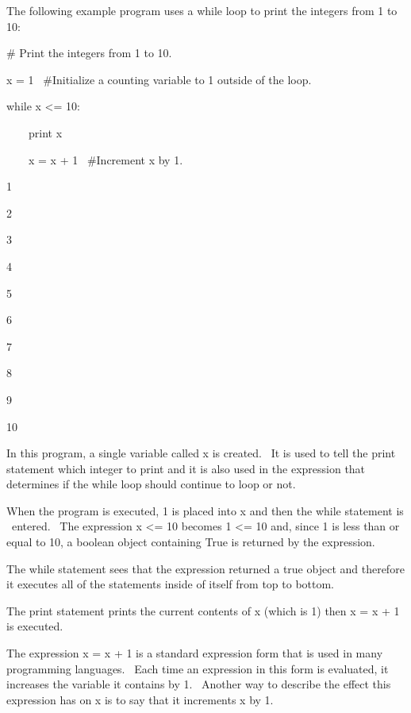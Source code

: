 \documentclass[12pt,twoside]{book}
\begin{document}
\bigskip

The following example program uses a while loop to print the integers from 1 to 10:


\bigskip

\# Print the integers from 1 to 10.


\bigskip

x = 1 \ \#Initialize a counting variable to 1 outside of the loop.


\bigskip

while x {\textless}= 10:

\ \ \ \ print x

\ \ \ \ x = x + 1 \ \#Increment x by 1.

{\textbar}

1

2

3

4

5

6

7

8

9

10

In this program, a single variable called x is created. \ It is used to tell the print statement which integer to print and it is also used in the expression that determines if the while loop should continue to loop or not. 

\bigskip

When the program is executed, 1 is placed into x and then the while statement is \ entered. \ The expression x {\textless}= 10 becomes 1 {\textless}= 10 and, since 1 is less than or equal to 10, a boolean object containing True is returned by the expression. 

\bigskip

The while statement sees that the expression returned a true object and therefore it executes all of the statements inside of itself from top to bottom.

\bigskip

The print statement prints the current contents of x (which is 1) then x = x + 1 is executed.

\bigskip

The expression x = x + 1 is a standard expression form that is used in many programming languages. \ Each time an expression in this form is evaluated, it increases the variable it contains by 1. \ Another way to describe the effect this expression has on x is to say that it increments x by 1. 
\end{document}

